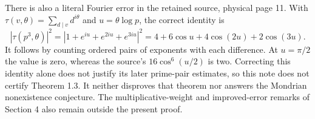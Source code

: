 \documentclass[11pt,a4paper]{article}
\begin{document}
There is also a literal Fourier error in the retained source, physical
page 11. With $\tau(v,\theta)=\sum_{d\mid v}d^{i\theta}$ and
$u=\theta\log p$, the correct identity is
\[
 |\tau(p^3,\theta)|^2
 =|1+e^{iu}+e^{2iu}+e^{3iu}|^2
 =4+6\cos u+4\cos(2u)+2\cos(3u).
\]
It follows by counting ordered pairs of exponents with each difference.
At $u=\pi/2$ the value is zero, whereas the source's
$16\cos^6(u/2)$ is two. Correcting this identity alone does not
justify its later prime-pair estimates, so this note does not certify
Theorem 1.3. It neither disproves that theorem nor answers the Mondrian
nonexistence conjecture. The multiplicative-weight and improved-error
remarks of Section 4 also remain outside the present proof.
\end{document}
